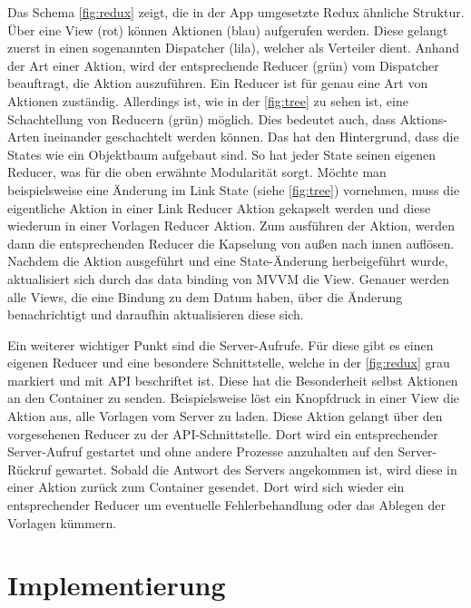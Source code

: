 \documentclass[notables, nomenclature, oneside, 150]{HSMW-Thesis}
\begin{document}
		Das Schema \ref{fig:redux} zeigt, die in der App umgesetzte Redux ähnliche Struktur. Über eine View (rot) können Aktionen (blau) aufgerufen werden. Diese gelangt zuerst in einen sogenannten Dispatcher (lila), welcher als Verteiler dient. Anhand der Art einer Aktion, wird der entsprechende Reducer (grün) vom Dispatcher beauftragt, die Aktion auszuführen. Ein Reducer ist für genau eine Art von Aktionen zuständig. Allerdings ist, wie in der \autoref{fig:tree} zu sehen ist, eine Schachtellung von Reducern (grün) möglich. Dies bedeutet auch, dass Aktions-Arten ineinander geschachtelt werden können. Das hat den Hintergrund, dass die States wie ein Objektbaum aufgebaut sind. So hat jeder State seinen eigenen Reducer, was für die oben erwähnte Modularität sorgt. Möchte man beispielsweise eine Änderung im Link State (siehe \ref{fig:tree}) vornehmen, muss die eigentliche Aktion in einer Link Reducer Aktion gekapselt werden und diese wiederum in einer Vorlagen Reducer Aktion. Zum ausführen der Aktion, werden dann die entsprechenden Reducer die Kapselung von außen nach innen auflösen. Nachdem die Aktion ausgeführt und eine State-Änderung herbeigeführt wurde, aktualisiert sich durch das data binding von MVVM die View. Genauer werden alle Views, die eine Bindung zu dem Datum haben, über die Änderung benachrichtigt und daraufhin aktualisieren diese sich.

		Ein weiterer wichtiger Punkt sind die Server-Aufrufe. Für diese gibt es einen eigenen Reducer und eine besondere Schnittstelle, welche in der \autoref{fig:redux} grau markiert und mit API  beschriftet ist. Diese hat die Besonderheit selbst Aktionen an den Container zu senden. Beispielsweise löst ein Knopfdruck in einer View die Aktion aus, alle Vorlagen vom Server zu laden. Diese Aktion gelangt über den vorgesehenen Reducer zu der API-Schnittstelle. Dort wird ein entsprechender Server-Aufruf gestartet und ohne andere Prozesse anzuhalten auf den Server-Rückruf gewartet. Sobald die Antwort des Servers angekommen ist, wird diese in einer Aktion zurück zum Container gesendet. Dort wird sich wieder ein entsprechender Reducer um eventuelle Fehlerbehandlung oder das Ablegen der Vorlagen kümmern.
		
	\section{Implementierung}\label{sc:implementierung}
		
\end{document}
